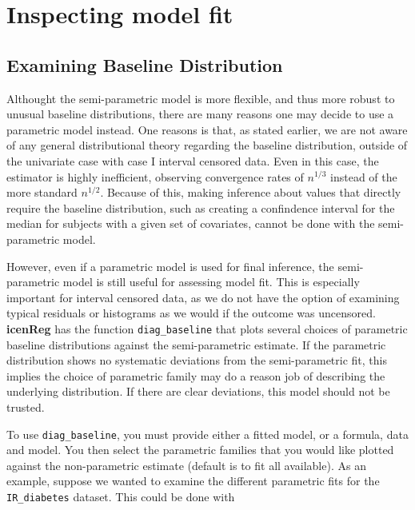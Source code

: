\documentclass[a4paper]{article}
\begin{document}
\section{Inspecting model fit}

\subsection{Examining Baseline Distribution}
  
Althought the semi-parametric model is more flexible, and thus more robust to unusual baseline distributions, there are many reasons one may decide to use a parametric model instead. One reasons is that, as stated earlier, we are not aware of any general distributional theory regarding the baseline distribution, outside of the univariate case with case I interval censored data. Even in this case, the estimator is highly inefficient, observing convergence rates of $n^{1/3}$ instead of the more standard $n^{1/2}$. Because of this, making inference about values that directly require the baseline distribution, such as creating a confindence interval for the median for subjects with a given set of covariates, cannot be done with the semi-parametric model. 
  
  
However, even if a parametric model is used for final inference, the semi-parametric model is still useful for assessing model fit. This is especially important for interval censored data, as we do not have the option of examining typical residuals or histograms as we would if the outcome was uncensored. {\bf icenReg} has the function \texttt{diag\_baseline} that plots several choices of parametric baseline distributions against the semi-parametric estimate. If the parametric distribution shows no systematic deviations from the semi-parametric fit, this implies the choice of parametric family may do a reason job of describing the underlying distribution. If there are clear deviations, this model should not be trusted. 
  
To use \texttt{diag\_baseline}, you must provide either a fitted model, or a formula, data and model. You then select the parametric families that you would like plotted against the non-parametric estimate (default is to fit all available). As an example, suppose we wanted to examine the different parametric fits for the \texttt{IR\_diabetes} dataset. This could be done with 
  
\end{document}

